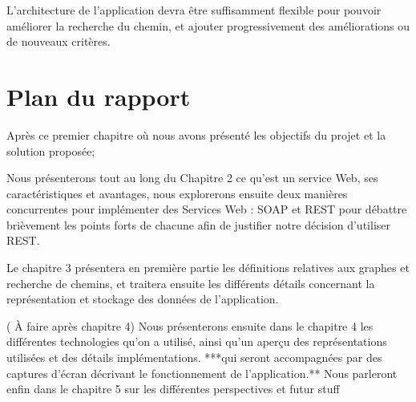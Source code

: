 L'architecture de l'application devra être suffisamment flexible pour pouvoir améliorer la recherche du chemin, et ajouter progressivement des améliorations ou de nouveaux critères.
	 
\section{Plan du rapport}

Après ce premier chapitre où nous avons présenté les objectifs du projet et la solution proposée; 

Nous présenterons tout au long du Chapitre 2 ce qu'est un service Web, ses caractéristiques et avantages, nous explorerons ensuite deux manières concurrentes pour implémenter des Services Web : SOAP et REST pour débattre brièvement les points forts de chacune afin de justifier notre décision d'utiliser REST.

Le chapitre 3 présentera en première partie les définitions relatives aux graphes et recherche de chemins, et traitera ensuite les différents détails concernant la représentation et stockage des données de l'application. 

( À faire après chapitre 4) \newline
Nous présenterons ensuite dans le chapitre 4 les différentes technologies qu'on a utilisé, ainsi qu'un aperçu des représentations utilisées et des détails implémentations. ***qui seront accompagnées par des captures d'écran décrivant le fonctionnement de l'application.**
Nous parleront	 enfin dans le chapitre 5 sur les différentes perspectives et futur stuff
